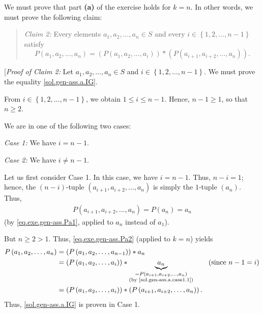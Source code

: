 \documentclass[paper=a4, fontsize=12pt]{scrartcl} %
\newcommand{\set}[1]{\left\{ #1 \right\}}
\newcommand{\tup}[1]{\left( #1 \right)}
\newcommand{\underbrack}[2]{\underbrace{#1}_{\substack{#2}}}
\theoremstyle{plainsl}
\theoremstyle{definition}
\theoremstyle{remark}
\newenvironment{statement}{\begin{quote}}{\end{quote}}
\begin{document}
We must prove that part \textbf{(a)} of the exercise
holds for $k = n$.
In other words, we must prove the following claim:

\begin{statement}
\textit{Claim 2:}
Every elements $a_1, a_2, \ldots, a_n \in S$
and every $i \in \set{1, 2, \ldots, n-1}$ satisfy
\begin{equation}
P \tup{a_1, a_2, \ldots, a_n}
= \tup{P \tup{a_1, a_2, \ldots, a_i}}
     * \tup{P \tup{a_{i+1}, a_{i+2}, \ldots, a_n}} .
\label{sol.gen-ass.a.IG}
\end{equation}
\end{statement}

[\textit{Proof of Claim 2:}
Let $a_1, a_2, \ldots, a_n \in S$ and
$i \in \set{1, 2, \ldots, n-1}$.
We must prove the equality \eqref{sol.gen-ass.a.IG}.

From $i \in \set{1, 2, \ldots, n-1}$, we obtain
$1 \leq i \leq n-1$. Hence, $n-1 \geq 1$, so that
$n \geq 2$.

We are in one of the following two cases:

\textit{Case 1:} We have $i = n-1$.

\textit{Case 2:} We have $i \neq n-1$.

Let us first consider Case 1.
In this case, we have $i = n-1$.
Thus, $n-i = 1$;
hence, the $\tup{n-i}$-tuple
$\tup{a_{i+1}, a_{i+2}, \ldots, a_n}$
is simply the $1$-tuple $\tup{a_n}$.
Thus,
\begin{align}
P \tup{a_{i+1}, a_{i+2}, \ldots, a_n}
= P \tup{a_n} = a_n
\label{sol.gen-ass.a.case1.1}
\end{align}
(by \eqref{eq.exe.gen-ass.Pa1}, applied to $a_n$ instead
of $a_1$).

But $n \geq 2 > 1$.
Thus, \eqref{eq.exe.gen-ass.Pa2} (applied to $k = n$)
yields
\begin{align*}
P \tup{a_1, a_2, \ldots, a_n}
&= \tup{P \tup{a_1, a_2, \ldots, a_{n-1}}} * a_n \\
&= \tup{P \tup{a_1, a_2, \ldots, a_i}}
     * \underbrack{a_n}{= P \tup{a_{i+1}, a_{i+2}, \ldots, a_n} \\
                        \tup{\text{by \eqref{sol.gen-ass.a.case1.1}}}}
   \qquad \tup{\text{since $n-1 = i$}} \\
&= \tup{P \tup{a_1, a_2, \ldots, a_i}}
     * \tup{P \tup{a_{i+1}, a_{i+2}, \ldots, a_n}} .
\end{align*}
Thus, \eqref{sol.gen-ass.a.IG} is proven in Case 1.
\end{document}

